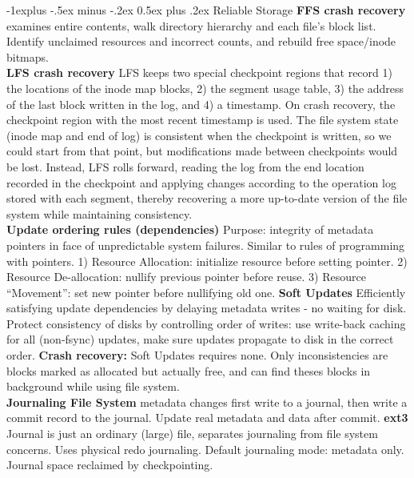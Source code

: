 \documentclass[6pt,landscape]{article}
\makeatletter
\renewcommand{\subsection}{\@startsection{subsection}{2}{0mm}%
                                {-1explus -.5ex minus -.2ex}%
                                {0.5ex plus .2ex}%
                                {\normalfont\normalsize\bfseries}}
\makeatother
\begin{document}
\begin{multicols}{3}
\subsection{Reliable Storage}
{\bf FFS crash recovery} examines entire contents, walk directory hierarchy and each file's block list. Identify unclaimed resources and incorrect counts, and rebuild free space/inode bitmaps.\\
{\bf LFS crash recovery} LFS keeps two special checkpoint regions that record 1) the locations of the inode map blocks, 2) the segment usage table, 3) the address of the last block written in the log, and 4) a timestamp. On crash recovery, the checkpoint region with the most recent timestamp is used. The file system state (inode map and end of log) is consistent when the checkpoint is written, so we could start from that point, but modifications made between checkpoints would be lost. Instead, LFS rolls forward, reading the log from the end location recorded in the checkpoint and applying changes according to the operation log stored with each segment, thereby recovering a more up-to-date version of the file system while maintaining consistency.\\
{\bf Update ordering rules (dependencies)} Purpose: integrity of metadata pointers in face of unpredictable system failures. Similar to rules of programming with pointers. 
1) Resource Allocation: initialize resource before setting pointer.
2) Resource De-allocation: nullify previous pointer before reuse.
3) Resource ``Movement'': set new pointer before nullifying old one.
{\bf Soft Updates} Efficiently satisfying update dependencies by delaying metadata writes - no waiting for disk. Protect consistency of disks by controlling order of writes: use write-back caching for all (non-fsync) updates, make sure updates propagate to disk in the correct order.
{\bf Crash recovery:} Soft Updates requires none. Only inconsistencies are blocks marked as allocated but actually free, and can find theses blocks in background while using file system.\\
{\bf Journaling File System} metadata changes first write to a journal, then write a commit record to the journal. Update real metadata and data after commit.
{\bf ext3} Journal is just an ordinary (large) file, separates journaling from file system concerns. Uses physical redo journaling. Default journaling mode: metadata only. Journal space reclaimed by checkpointing.

\end{multicols}
\end{document}
